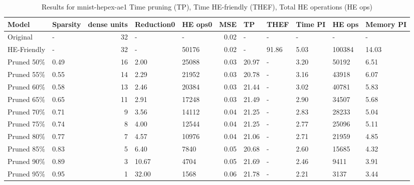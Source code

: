 \begin{table}
\centering
\caption{Results for mnist-hepex-ae1  Time pruning (TP), Time HE-friendly (THEF), Total HE operations (HE ops)}
\begin{tabular}{llrllrlllll}
\toprule
      Model & Sparsity &  dense units & Reduction0 & HE ops0 &  MSE &    TP &  THEF & Time PI & HE ops & Memory PI \\
\midrule
   Original &        - &           32 &          - &       - & 0.02 &     - &     - &       - &      - &         - \\
HE-Friendly &        - &           32 &          - &   50176 & 0.02 &     - & 91.86 &    5.03 & 100384 &     14.03 \\
 Pruned 50\% &     0.49 &           16 &       2.00 &   25088 & 0.03 & 20.97 &     - &    3.20 &  50192 &      6.51 \\
 Pruned 55\% &     0.55 &           14 &       2.29 &   21952 & 0.03 & 20.78 &     - &    3.16 &  43918 &      6.07 \\
 Pruned 60\% &     0.58 &           13 &       2.46 &   20384 & 0.03 & 21.44 &     - &    3.02 &  40781 &      5.83 \\
 Pruned 65\% &     0.65 &           11 &       2.91 &   17248 & 0.03 & 21.49 &     - &    2.90 &  34507 &      5.68 \\
 Pruned 70\% &     0.71 &            9 &       3.56 &   14112 & 0.04 & 21.25 &     - &    2.83 &  28233 &      5.04 \\
 Pruned 75\% &     0.74 &            8 &       4.00 &   12544 & 0.04 & 21.25 &     - &    2.77 &  25096 &      5.11 \\
 Pruned 80\% &     0.77 &            7 &       4.57 &   10976 & 0.04 & 21.06 &     - &    2.71 &  21959 &      4.85 \\
 Pruned 85\% &     0.83 &            5 &       6.40 &    7840 & 0.05 & 20.68 &     - &    2.60 &  15685 &      4.32 \\
 Pruned 90\% &     0.89 &            3 &      10.67 &    4704 & 0.05 & 21.69 &     - &    2.46 &   9411 &      3.91 \\
 Pruned 95\% &     0.95 &            1 &      32.00 &    1568 & 0.06 & 21.78 &     - &    2.21 &   3137 &      3.44 \\
\bottomrule
\end{tabular}
\end{table}
